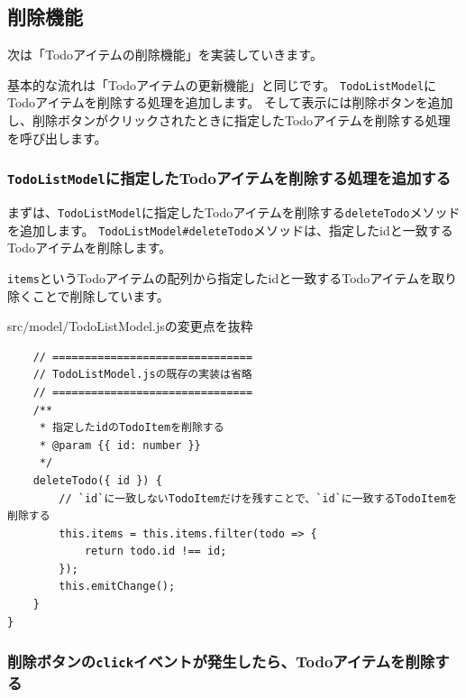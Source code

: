 \hypertarget{delete}{%
\subsection{削除機能}\label{delete}}

次は「Todoアイテムの削除機能」を実装していきます。

基本的な流れは「Todoアイテムの更新機能」と同じです。
\texttt{TodoListModel}にTodoアイテムを削除する処理を追加します。
そして表示には削除ボタンを追加し、削除ボタンがクリックされたときに指定したTodoアイテムを削除する処理を呼び出します。

\hypertarget{TodoListModel-deleteTodo}{%
\subsubsection{\texorpdfstring{\texttt{TodoListModel}に指定したTodoアイテムを削除する処理を追加する}{TodoListModelに指定したTodoアイテムを削除する処理を追加する}}\label{TodoListModel-deleteTodo}}

まずは、\texttt{TodoListModel}に指定したTodoアイテムを削除する\texttt{deleteTodo}メソッドを追加します。
\texttt{TodoListModel\#deleteTodo}メソッドは、指定したidと一致するTodoアイテムを削除します。

\texttt{items}というTodoアイテムの配列から指定したidと一致するTodoアイテムを取り除くことで削除しています。

\begin{listtitle}
src/model/TodoListModel.jsの変更点を抜粋
\end{listtitle}
\begin{lstlisting}
    // ===============================
    // TodoListModel.jsの既存の実装は省略
    // ===============================
    /**
     * 指定したidのTodoItemを削除する
     * @param {{ id: number }}
     */
    deleteTodo({ id }) {
        // `id`に一致しないTodoItemだけを残すことで、`id`に一致するTodoItemを削除する
        this.items = this.items.filter(todo => {
            return todo.id !== id;
        });
        this.emitChange();
    }
}
\end{lstlisting}
\listend

\hypertarget{onChange-update-model}{%
\subsubsection{\texorpdfstring{削除ボタンの\texttt{click}イベントが発生したら、Todoアイテムを削除する}{削除ボタンのclickイベントが発生したら、Todoアイテムを削除する}}\label{onChange-update-model}}

